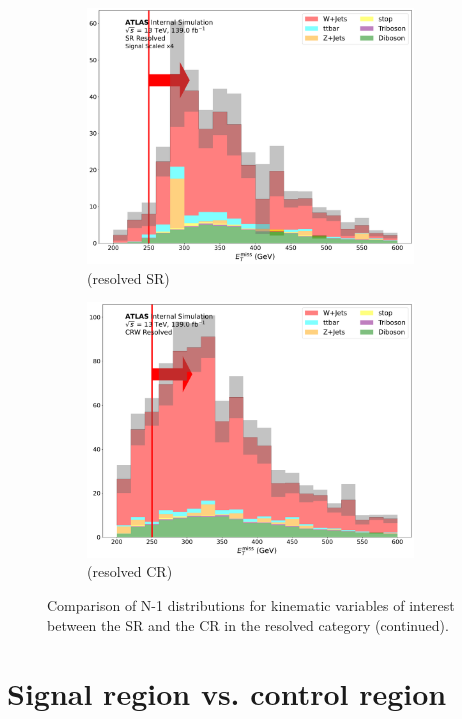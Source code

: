 \begin{figure}[htbp]
\begin{subfigure}{0.45\textwidth}
     \includegraphics[width = 0.95\textwidth]{Figures/App_SR_CR_distributions/SR1L_Resolved/MetTST_met_N_1.pdf}
    \caption{\met (resolved SR)}
     \end{subfigure}
    \begin{subfigure}{0.45\textwidth}
     \includegraphics[width = 0.95\textwidth]{Figures/App_SR_CR_distributions/CRW_Resolved/MetTST_met_N_1.pdf}
     \caption{\met (resolved \wjets CR)}
     \end{subfigure}
     \caption{Comparison of N-1 distributions for kinematic variables of interest between the SR and the \wjets CR in the resolved category (continued).}
  \end{figure}


\section{Signal region vs. \ttbar control region}
\label{app:appendix_SR_CR_distributions_ttbar}

